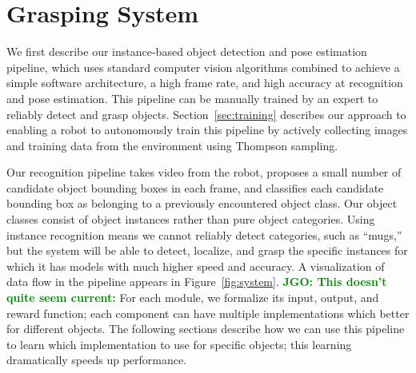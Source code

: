 \documentclass{article}
\newcommand{\jgonote}[1]{\textcolor{green}{\textbf{JGO: #1}}}
\begin{document}


\section{Grasping System}

We first describe our instance-based object detection and pose
estimation pipeline, which uses standard computer vision algorithms
combined to achieve a simple software architecture, a high frame rate,
and high accuracy at recognition and pose estimation.  This pipeline
can be manually trained by an expert to reliably detect and grasp
objects.  Section~\ref{sec:training} describes our approach to
enabling a robot to autonomously train this pipeline by actively
collecting images and training data from the environment using
Thompson sampling.

Our recognition pipeline takes video from the robot, proposes a small
number of candidate object bounding boxes in each frame, and
classifies each candidate bounding box as belonging to a previously
encountered object class. Our object classes consist of object
instances rather than pure object categories.  Using instance
recognition means we cannot reliably detect categories, such as
``mugs,'' but the system will be able to detect, localize, and grasp
the specific instances for which it has models with much higher speed
and accuracy.  A visualization of data flow in the pipeline appears in
Figure~\ref{fig:system}.  \jgonote{This doesn't quite seem current:}
For each module, we formalize its input,
output, and reward function; each component can have multiple
implementations which better for different objects.  The following
sections describe how we can use this pipeline to learn which
implementation to use for specific objects; this learning dramatically
speeds up performance.
\end{document}
